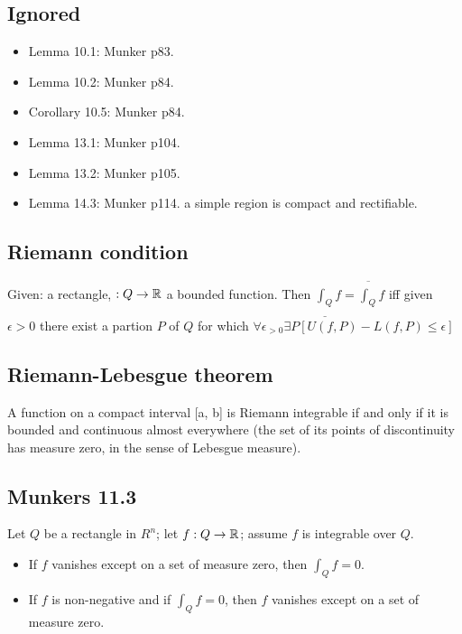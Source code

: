 \subsection{Ignored}
\begin{itemize}
\item Lemma 10.1: Munker p83.
\item Lemma 10.2: Munker p84.
\item Corollary 10.5: Munker p84.
\item Lemma 13.1: Munker p104.
\item Lemma 13.2: Munker p105.
\item Lemma 14.3: Munker p114. a simple region is compact and rectifiable.
\end{itemize}


\subsection{Riemann condition}
Given:  a rectangle,  $: Q\to {\mathbb R}$ a bounded function. Then
$\underline{\int_Q}f = \overline{\int_Q}f$ iff
given $\epsilon>0$ there exist a partion $P$ of $Q$ for which
$\forall\epsilon_{>0}\exists P[U(f, P)-L(f, P)\leq\epsilon]$



\subsection{Riemann-Lebesgue theorem}
A function on a compact interval [a, b] is Riemann integrable if and only if it is bounded and continuous almost everywhere (the set of its points of discontinuity has measure zero, in the sense of Lebesgue measure).

\subsection{Munkers 11.3}
Let $Q$ be a rectangle in $R^n$; let $f:Q \to {\mathbb R}$; assume $f$ is integrable over $Q$.
\begin{itemize}
\item If $f$ vanishes except on a set of measure zero, then $\int_Q f=0$.
\item If $f$ is non-negative and if $\int_Q f=0$, then $f$ vanishes except on a set of measure zero.
\end{itemize}



